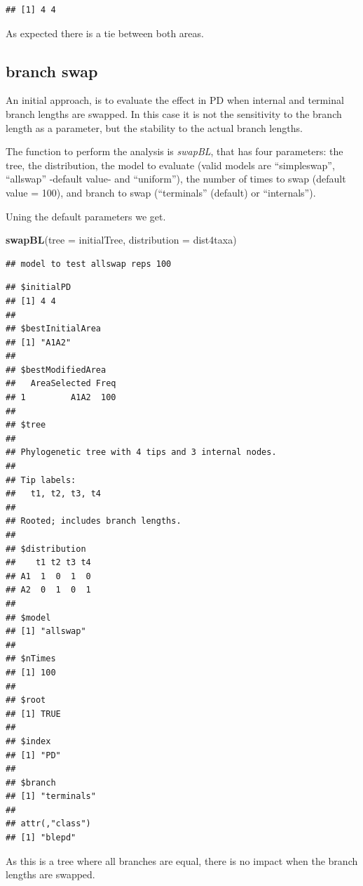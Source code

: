 \documentclass[]{article}
\newenvironment{Shaded}{\begin{snugshade}}{\end{snugshade}}
\newcommand{\DataTypeTok}[1]{\textcolor[rgb]{0.13,0.29,0.53}{#1}}
\newcommand{\KeywordTok}[1]{\textcolor[rgb]{0.13,0.29,0.53}{\textbf{#1}}}
\newcommand{\NormalTok}[1]{#1}
\begin{document}
\begin{verbatim}
## [1] 4 4
\end{verbatim}

As expected there is a tie between both areas.

\hypertarget{branch-swap}{%
\subsection{branch swap}\label{branch-swap}}

An initial approach, is to evaluate the effect in PD when internal and
terminal branch lengths are swapped. In this case it is not the
sensitivity to the branch length as a parameter, but the stability to
the actual branch lengths.

The function to perform the analysis is \emph{swapBL}, that has four
parameters: the tree, the distribution, the model to evaluate (valid
models are ``simpleswap'', ``allswap'' -default value- and ``uniform''),
the number of times to swap (default value = 100), and branch to swap
(``terminals'' (default) or ``internals'').

Uning the default parameters we get.

\begin{Shaded}
\begin{Highlighting}[]
\KeywordTok{swapBL}\NormalTok{(}\DataTypeTok{tree =}\NormalTok{ initialTree,}
       \DataTypeTok{distribution =}\NormalTok{ dist4taxa)}
\end{Highlighting}
\end{Shaded}

\begin{verbatim}
## model to test allswap reps 100
\end{verbatim}

\begin{verbatim}
## $initialPD
## [1] 4 4
## 
## $bestInitialArea
## [1] "A1A2"
## 
## $bestModifiedArea
##   AreaSelected Freq
## 1         A1A2  100
## 
## $tree
## 
## Phylogenetic tree with 4 tips and 3 internal nodes.
## 
## Tip labels:
##   t1, t2, t3, t4
## 
## Rooted; includes branch lengths.
## 
## $distribution
##    t1 t2 t3 t4
## A1  1  0  1  0
## A2  0  1  0  1
## 
## $model
## [1] "allswap"
## 
## $nTimes
## [1] 100
## 
## $root
## [1] TRUE
## 
## $index
## [1] "PD"
## 
## $branch
## [1] "terminals"
## 
## attr(,"class")
## [1] "blepd"
\end{verbatim}

As this is a tree where all branches are equal, there is no impact when
the branch lengths are swapped.
\end{document}
